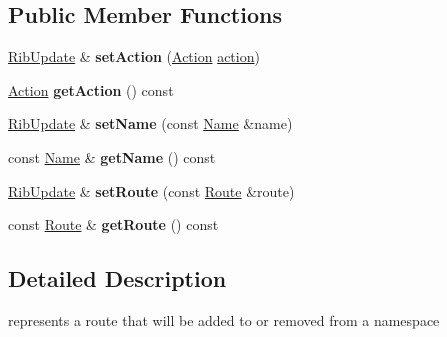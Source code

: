 \subsection*{Public Member Functions}
\begin{DoxyCompactItemize}
\item 
\hyperlink{classnfd_1_1rib_1_1RibUpdate}{Rib\+Update} \& {\bfseries set\+Action} (\hyperlink{classnfd_1_1rib_1_1RibUpdate_aab70f45176a2e455a92b555dba35b91e}{Action} \hyperlink{structaction}{action})\hypertarget{classnfd_1_1rib_1_1RibUpdate_a48bd795085828e8e761bf7f9ba64bec8}{}\label{classnfd_1_1rib_1_1RibUpdate_a48bd795085828e8e761bf7f9ba64bec8}

\item 
\hyperlink{classnfd_1_1rib_1_1RibUpdate_aab70f45176a2e455a92b555dba35b91e}{Action} {\bfseries get\+Action} () const\hypertarget{classnfd_1_1rib_1_1RibUpdate_abe0e76dfc19d008168a58493f3c33853}{}\label{classnfd_1_1rib_1_1RibUpdate_abe0e76dfc19d008168a58493f3c33853}

\item 
\hyperlink{classnfd_1_1rib_1_1RibUpdate}{Rib\+Update} \& {\bfseries set\+Name} (const \hyperlink{classndn_1_1Name}{Name} \&name)\hypertarget{classnfd_1_1rib_1_1RibUpdate_ac426f8ce218e27aee54c62cac69b5b13}{}\label{classnfd_1_1rib_1_1RibUpdate_ac426f8ce218e27aee54c62cac69b5b13}

\item 
const \hyperlink{classndn_1_1Name}{Name} \& {\bfseries get\+Name} () const\hypertarget{classnfd_1_1rib_1_1RibUpdate_a08d01365c043e59582c0762cb9426278}{}\label{classnfd_1_1rib_1_1RibUpdate_a08d01365c043e59582c0762cb9426278}

\item 
\hyperlink{classnfd_1_1rib_1_1RibUpdate}{Rib\+Update} \& {\bfseries set\+Route} (const \hyperlink{classnfd_1_1rib_1_1Route}{Route} \&route)\hypertarget{classnfd_1_1rib_1_1RibUpdate_ae5199f4beaded80e25c0056ecb6c8fc6}{}\label{classnfd_1_1rib_1_1RibUpdate_ae5199f4beaded80e25c0056ecb6c8fc6}

\item 
const \hyperlink{classnfd_1_1rib_1_1Route}{Route} \& {\bfseries get\+Route} () const\hypertarget{classnfd_1_1rib_1_1RibUpdate_a0b43229079ece99ba0e98b3f520b4fb7}{}\label{classnfd_1_1rib_1_1RibUpdate_a0b43229079ece99ba0e98b3f520b4fb7}

\end{DoxyCompactItemize}


\subsection{Detailed Description}
represents a route that will be added to or removed from a namespace 

